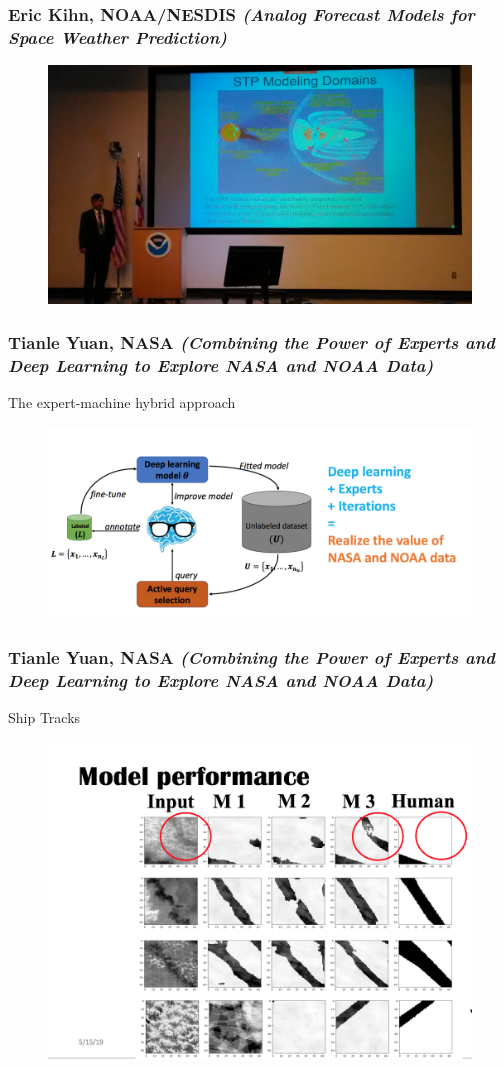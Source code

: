 \documentclass{beamer}
\begin{document}
\begin{frame}
\frametitle{Eric Kihn, NOAA/NESDIS \textit{(Analog Forecast Models for Space Weather Prediction)}}
\begin{figure}
	\includegraphics[width=.9\linewidth]{figs/P_20190425_093405.jpg}
\end{figure}
\end{frame}

\begin{frame}
\frametitle{Tianle Yuan, NASA \textit{(Combining the Power of Experts and Deep Learning to Explore NASA and NOAA Data)}}
The expert-machine hybrid approach
\begin{figure}
	\includegraphics[width=.9\linewidth]{figs/ScreenShot_expert.png}
\end{figure}
\end{frame}

\begin{frame}
\frametitle{Tianle Yuan, NASA \textit{(Combining the Power of Experts and Deep Learning to Explore NASA and NOAA Data)}}
Ship Tracks
\begin{figure}
	\includegraphics[width=.75\linewidth]{figs/ScreenShot_ModelPerformance.png}
\end{figure}
\end{frame}
\end{document}
